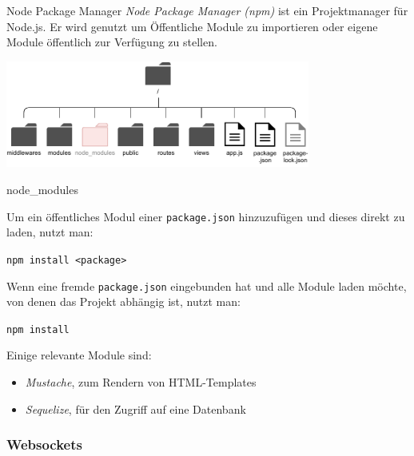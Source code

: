 \begin{defi}{Node Package Manager}
    \emph{Node Package Manager (npm)} ist ein Projektmanager für Node.js.
    Er wird genutzt um Öffentliche Module zu importieren oder eigene Module öffentlich zur Verfügung zu stellen.
\end{defi}

\begin{center}
    \includegraphics[width=0.75\textwidth]{includes/figures/bonus_nodejs_node_modules.pdf}
\end{center}

\begin{bonus}{node\_modules}

    Um ein öffentliches Modul einer \texttt{package.json} hinzuzufügen und dieses direkt zu laden, nutzt man:

    \begin{center}
        \texttt{npm install <package>}
    \end{center}

    Wenn eine fremde \texttt{package.json} eingebunden hat und alle Module laden möchte, von denen das Projekt abhängig ist, nutzt man:
    \begin{center}
        \texttt{npm install}
    \end{center}

    Einige relevante Module sind:
    \begin{itemize}
        \item \emph{Mustache}, zum Rendern von HTML-Templates
        \item \emph{Sequelize}, für den Zugriff auf eine Datenbank
    \end{itemize}
\end{bonus}

\subsubsection{Websockets}

